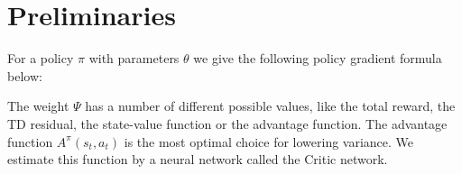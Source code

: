 \section{Preliminaries}
\label{sec:preliminaries}

For a policy $\pi$ with parameters $\theta$ we give the following policy gradient formula below:

The weight $\Psi$ has a number of different possible values, like the total reward, the TD residual, the state-value function or the advantage function. The advantage function $A^\pi(s_t, a_t)$ is the most optimal choice for lowering variance. We estimate this function by a neural network called the Critic network.

